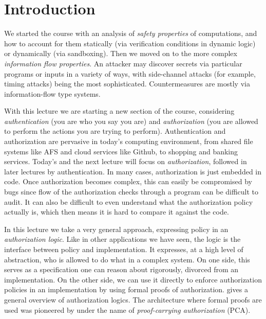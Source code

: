 \documentclass[11pt]{article}
\begin{document}
\maketitle

\section{Introduction}

We started the course with an analysis of \emph{safety properties} of
computations, and how to account for them statically (via verification conditions in
dynamic logic) or dynamically (via sandboxing).  Then we moved on to the more
complex \emph{information flow properties}.  An attacker may discover secrets
via particular programs or inputs in a variety of ways, with side-channel
attacks (for example, timing attacks) being the most sophisticated.
Countermeasures are mostly via information-flow type systems.

With this lecture we are starting a new section of the course, considering
\emph{authentication} (you are who you say you are) and \emph{authorization}
(you are allowed to perform the actions you are trying to perform).
Authentication and authorization are pervasive in today's computing environment,
from shared file systems like AFS and cloud services like Github, to shopping
and banking services.  Today's and the next lecture will focus on
\emph{authorization}, followed in later lectures by authentication.  In many
cases, authorization is just embedded in code.  Once authorization becomes
complex, this can easily be compromised by bugs since flow of the authorization
checks through a program can be difficult to audit.  It can also be difficult to
even understand what the authorization policy actually is, which then means it
is hard to compare it against the code.

In this lecture we take a very general approach, expressing policy in an
\emph{authorization logic}.  Like in other applications we have seen, the logic
is the interface between policy and implementation.  It expresses, at a high
level of abstraction, who is allowed to do what in a complex system.  On one
side, this serves as a specification one can reason about rigorously, divorced
from an implementation.  On the other side, we can use it directly to enforce
authorization policies in an implementation by using formal proofs of
authorization.  \citet{Abadi03lics} gives a general overview of authorization
logics.  The architecture where formal proofs are used was pioneered by
\citet{Bauer03phd} under the name of \emph{proof-carrying authorization} (PCA).
\end{document}

